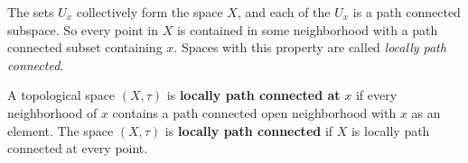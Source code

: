 \begin{comment}

\ActivitySolution

\ba
\item Every open set containing $x$ contains $U_x$. Since $y \in U_x$, it follows that $y \in O$. Suppose $x \in O$. Why must $y$ also be in $O$? Since $p(t) \in O$ for every $t$ in $[0,1]$, we conclude that $p^{-1}(O) = [0,1]$.  

\item Now suppose $x \notin O$. 
	\begin{enumerate}[i.]
	\item If $y \in O$, then $p^{-1}(O) =  \left[0, \frac{1}{2}\right)$.
		
	\item If $y \notin O$, then $p^{-1}{O} =  \emptyset$.
		
	\end{enumerate}

\item So $p^{-1}(O)$ is open in $[0,1]$ for every open set $O$ in $X$. Therefore, $p$ is continuous and is a path from $y$ to $x$. 

\item We have seen that there is a path $p_{yx}$ from $y$ to $x$ for any $y \in U_x$. Let $a$ and $b$ be points  in $U_x$. There is a path $p_{ax}$ from $a$ to $x$ and a path $p_{bx}$ from $b$ to $x$. Since points being path connected is a symmetric relation, there is a path $p_{xb}$ from $x$ to $b$. Then path product $p_{xb}*p_{ax}$ is then a path from $a$ to $b$ in $U_x$. Since path-connectedness is reflexive and symmetric, we conclude that there is a path between any two points in $U_x$, so $U_x$ is a path connected set. 

\ea

\end{comment}

The sets $U_x$ collectively form the space $X$, and each of the $U_x$ is a path connected subspace. So every point in $X$ is contained in some neighborhood with a path connected subset containing $x$. Spaces with this property are called \emph{locally path connected}.

\begin{definition} A topological space $(X, \tau)$ is \textbf{locally path connected at } $x$ if every neighborhood of $x$ contains a path connected open neighborhood with $x$ as an element. The space $(X, \tau)$ is \textbf{locally path connected} if $X$ is locally path connected at every point.
\end{definition}

